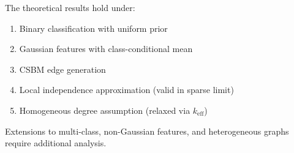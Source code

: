 \begin{remark}
\label{rem:scope}
The theoretical results hold under:
\begin{enumerate}
    \item Binary classification with uniform prior
    \item Gaussian features with class-conditional mean
    \item CSBM edge generation
    \item Local independence approximation (valid in sparse limit)
    \item Homogeneous degree assumption (relaxed via $k_{\mathrm{eff}}$)
\end{enumerate}
Extensions to multi-class, non-Gaussian features, and heterogeneous graphs require additional analysis.
\end{remark}

